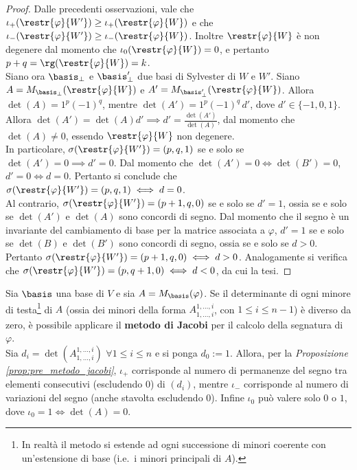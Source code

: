 \begin{proof}
	Dalle precedenti osservazioni, vale che $\iota_+(\restr{\varphi}{W'}) \geq \iota_+(\restr{\varphi}{W})$
	e che $\iota_-(\restr{\varphi}{W'}) \geq \iota_-(\restr{\varphi}{W})$. Inoltre $\restr{\varphi}{W}$
	è non degenere dal momento che $\iota_0(\restr{\varphi}{W}) = 0$, e pertanto
	$p + q = \rg(\restr{\varphi}{W}) = k$. \\
	
	Siano ora $\basis_\perp$ e $\basis_\perp'$ due basi di Sylvester di $W$ e $W'$. Siano $A = M_{\basis_\perp}(\restr{\varphi}{W})$
	e $A' = M_{\basis_\perp'}(\restr{\varphi}{W})$. Allora $\det(A) = 1^p (-1)^q$, mentre $\det(A') = 1^p (-1)^q \, d'$,
	dove $d' \in \{-1, 0, 1\}$. Allora $\det(A') = \det(A) d' \implies d' = \frac{\det(A')}{\det(A)}$, dal
	momento che $\det(A) \neq 0$, essendo $\restr{\varphi}{W}$ non degenere. \\
	
	In particolare, $\sigma(\restr{\varphi}{W'}) = (p, q, 1)$ se e solo se $\det(A') = 0 \implies d' = 0$. Dal
	momento che $\det(A') = 0 \iff \det(B') = 0$, $d' = 0 \iff d = 0$. Pertanto si conclude che
	$\sigma(\restr{\varphi}{W'}) = (p, q, 1) \iff d = 0$. \\
	
	Al contrario, $\sigma(\restr{\varphi}{W'}) = (p+1, q, 0)$ se e solo se $d' = 1$, ossia se e solo se $\det(A')$
	e $\det(A)$ sono concordi di segno. Dal momento che il segno è un invariante del cambiamento di base per la
	matrice associata a $\varphi$, $d' = 1$ se e solo se $\det(B)$ e $\det(B')$ sono concordi di segno, ossia
	se e solo se $d > 0$. Pertanto $\sigma(\restr{\varphi}{W'}) = (p+1, q, 0) \iff d > 0$. Analogamente si
	verifica che $\sigma(\restr{\varphi}{W'}) = (p, q+1, 0) \iff d < 0$, da cui la tesi.
\end{proof}

\begin{algorithm} \label{alg:metodo_jacobi}
	Sia $\basis$ una base di $V$ e sia $A = M_\basis(\varphi)$. Se il determinante di ogni minore di testa\footnote{In realtà il metodo si estende ad ogni successione di minori coerente con un'estensione di base (i.e.~i minori principali di $A$).}
	di $A$ (ossia dei minori della forma $A^{1, \ldots, i}_{1, \ldots, i}$, con $1 \leq i \leq n-1$) è diverso
	da zero, è possibile applicare il \textbf{metodo di Jacobi} per il calcolo della segnatura di $\varphi$. \\
	
	Sia $d_i = \det\left(A^{1,\ldots,i}_{1,\ldots,i}\right)$ $\forall 1 \leq i \leq n$ e si ponga $d_0 := 1$. Allora, per la \textit{Proposizione \ref{prop:pre_metodo_jacobi}}, $\iota_+$ corrisponde al numero di permanenze del segno
	tra elementi consecutivi (escludendo $0$) di $(d_i)$, mentre $\iota_-$ corrisponde al numero di variazioni
	del segno (anche stavolta escludendo $0$). Infine $\iota_0$ può valere solo $0$ o $1$, dove $\iota_0 = 1 \iff \det(A) = 0$.
\end{algorithm}


